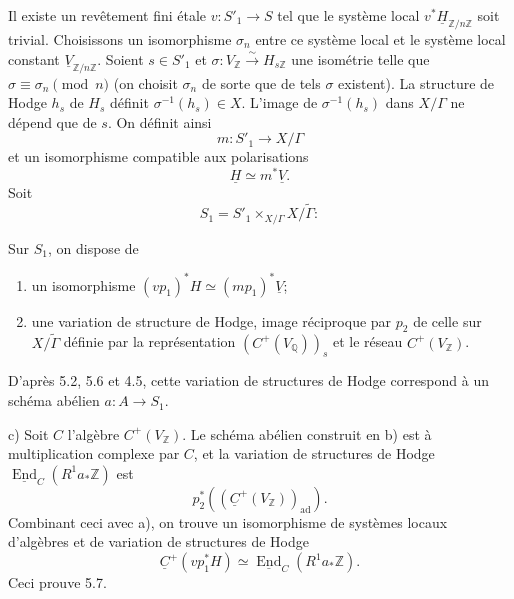 \documentclass[10pt,leqno]{article}
\newcommand{\Q}{\mathbb{Q}}
\newcommand{\Z}{\mathbb{Z}}
\newcommand{\End}{\operatorname{End}}
\newcommand{\ad}{\operatorname{ad}}
\begin{document}
Il existe un revêtement fini étale $v:S'_1\to S$ tel que le système local $v^*\underline H_{\Z/n\Z}$ soit trivial. Choisissons un isomorphisme $\sigma_n$ entre ce système local et le système local constant $\underline V_{\Z/n\Z}$. Soient $s\in S'_1$ et $\sigma:V_\Z\xrightarrow{\sim}H_{s\Z}$ une isométrie telle que $\sigma\equiv\sigma_n\pmod n$ (on choisit $\sigma_n$ de sorte que de tels $\sigma$ existent). La structure de Hodge $h_s$ de $H_s$ définit $\sigma^{-1}(h_s)\in X$. L'image de $\sigma^{-1}(h_s)$ dans $X/\Gamma$ ne dépend que de $s$. On définit ainsi
\[
m:S'_1\longrightarrow X/\Gamma
\]
et un isomorphisme compatible aux polarisations
\[
\underline H\simeq m^*\underline V.
\]
Soit
\[
S_1=S'_1\times_{X/\Gamma}X/\widetilde\Gamma:
\]
\begin{center}
\end{center}

\clearpage

Sur $S_1$, on dispose de
\begin{enumerate}[label=\alph*)]
\item un isomorphisme $(v p_1)^*H\simeq(m p_1)^*\underline V$;
\item une variation de structure de Hodge, image réciproque par $p_2$ de celle sur $X/\widetilde\Gamma$ définie par la représentation $(C^+(V_\Q))_s$ et le réseau $C^+(V_\Z)$.
\end{enumerate}
D'après 5.2, 5.6 et 4.5, cette variation de structures de Hodge correspond à un schéma abélien $a:A\to S_1$.

c) Soit $C$ l'algèbre $C^+(V_\Z)$. Le schéma abélien construit en b) est à multiplication complexe par $C$, et la variation de structures de Hodge $\underline{\End}_C(R^1a_*\Z)$ est
\[
p_2^*((\underline C^+(V_\Z))_{\ad}).
\]
Combinant ceci avec a), on trouve un isomorphisme de systèmes locaux d'algèbres et de variation de structures de Hodge
\[
\underline C^+(v p_1^*H)\simeq\underline{\End}_C(R^1a_*\Z).
\]
Ceci prouve 5.7.
\end{document}
